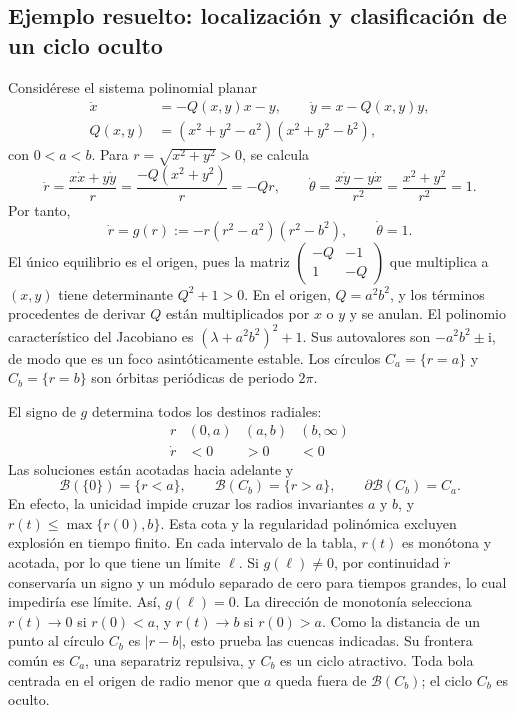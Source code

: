 \subsection{Ejemplo resuelto: localización y clasificación de un ciclo oculto}
\label{subsec:guide-hidden-cycle-topology}

Considérese el sistema polinomial planar
\begin{equation}
 \begin{aligned}
 \dot x&=-Q(x,y)x-y,\qquad
 \dot y=x-Q(x,y)y,\\
 Q(x,y)&=(x^2+y^2-a^2)(x^2+y^2-b^2),
 \end{aligned}
 \label{eq:guide-hidden-cycle-field}
\end{equation}
con \(0<a<b\). Para \(r=\sqrt{x^2+y^2}>0\), se calcula
\[
 \dot r=\frac{x\dot x+y\dot y}{r}
 =\frac{-Q(x^2+y^2)}r=-Qr,\qquad
 \dot\theta=\frac{x\dot y-y\dot x}{r^2}
 =\frac{x^2+y^2}{r^2}=1.
\]
Por tanto,
\begin{equation}
 \dot r=g(r):=-r(r^2-a^2)(r^2-b^2),
 \qquad \dot\theta=1.
 \label{eq:guide-hidden-cycle-radial}
\end{equation}
El único equilibrio es el origen, pues la matriz
\(\left(\begin{smallmatrix}-Q&-1\\1&-Q\end{smallmatrix}\right)\)
que multiplica a \((x,y)\) tiene determinante \(Q^2+1>0\).
En el origen, \(Q=a^2b^2\), y los términos procedentes de derivar
\(Q\) están multiplicados por \(x\) o \(y\) y se anulan.
El polinomio característico del Jacobiano es
\((\lambda+a^2b^2)^2+1\). Sus autovalores son
\(-a^2b^2\pm\mathrm i\), de modo que es un foco asintóticamente estable.
Los círculos \(C_a=\{r=a\}\) y \(C_b=\{r=b\}\) son órbitas periódicas
de periodo \(2\pi\).

El signo de \(g\) determina todos los destinos radiales:
\[
 \begin{array}{c|ccc}
 r & (0,a)&(a,b)&(b,\infty)\\ \hline
 \dot r&<0&>0&<0
 \end{array}
\]
Las soluciones están acotadas hacia adelante y
\begin{equation}
 \mathcal B(\{0\})=\{r<a\},\qquad
 \mathcal B(C_b)=\{r>a\},\qquad
 \partial\mathcal B(C_b)=C_a.
 \label{eq:guide-hidden-cycle-basins}
\end{equation}
En efecto, la unicidad impide cruzar los radios invariantes \(a\) y \(b\),
y \(r(t)\le\max\{r(0),b\}\). Esta cota y la regularidad polinómica
excluyen explosión en tiempo finito. En cada intervalo de la tabla,
\(r(t)\) es monótona y acotada, por lo que tiene un límite \(\ell\).
Si \(g(\ell)\ne0\), por continuidad \(\dot r\) conservaría un signo y
un módulo separado de cero para tiempos grandes, lo cual impediría ese
límite. Así, \(g(\ell)=0\). La dirección de monotonía selecciona
\(r(t)\to0\) si \(r(0)<a\), y \(r(t)\to b\) si \(r(0)>a\).
Como la distancia de un punto al círculo \(C_b\) es \(|r-b|\), esto
prueba las cuencas indicadas. Su frontera común es \(C_a\), una
separatriz repulsiva, y \(C_b\)
es un ciclo atractivo. Toda bola centrada en el origen de radio menor que
\(a\) queda fuera de \(\mathcal B(C_b)\); el ciclo \(C_b\) es oculto.

